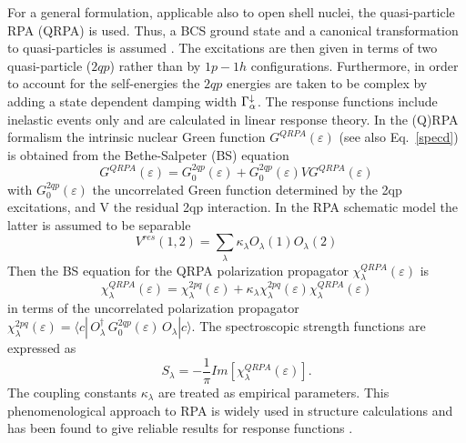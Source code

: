 For a general formulation, applicable also to open shell nuclei, the
quasi-particle RPA (QRPA) is used. Thus, a BCS%
 ground state and a canonical transformation to quasi-particles
is assumed \cite{RS}. The excitations are then given in terms of two
quasi-particle ($2qp$) rather than by $1p-1h$ configurations. Furthermore,
in order to account for the self-energies the $2qp$ energies are taken to be
complex by adding a state dependent damping width $\Gamma_{\alpha}^{%
\downarrow}$. The response functions include inelastic events only and are
calculated in linear response theory. In the (Q)RPA formalism the intrinsic
nuclear Green function $G^{QRPA}(\varepsilon)$ (see also Eq.~\ref{specd}) is
obtained from the Bethe-Salpeter (BS) equation \cite{Wal} 
\begin{equation}
G^{QRPA}(\varepsilon) = G_{0}^{2qp}(\varepsilon)+
G_{0}^{2qp}(\varepsilon)VG^{QRPA}(\varepsilon)  \label{bs1}
\end{equation}
with $G_{0}^{2qp}(\varepsilon)$ the uncorrelated Green function determined
by the 2qp excitations, and V the residual 2qp interaction. In the RPA
schematic model the latter is assumed to be separable 
\begin{equation}
V^{res}(1,2)=\sum_{\lambda}\kappa _{\lambda}O_{\lambda}(1)O_{\lambda}(2)
\end{equation}
Then the BS equation for the QRPA polarization propagator $%
\chi_{\lambda}^{QRPA}(\varepsilon)$ is \cite{Lenske:01} 
\begin{equation}
\chi_{\lambda}^{QRPA}(\varepsilon)= \chi_{\lambda}^{2pq}(\varepsilon) +
\kappa_{\lambda}\chi_{\lambda}^{2pq}(\varepsilon)\chi_{\lambda}^{QRPA}(%
\varepsilon)  \label{bs2}
\end{equation}
in terms of the uncorrelated polarization propagator $\chi_{\lambda}^{2pq}
(\varepsilon) = \langle c|\,O_{\lambda}^{\dagger }\,G_{0}^{2qp}(\varepsilon
)\,O_{\lambda}|c\rangle$. The spectroscopic strength functions are expressed
as 
\begin{equation}
S_{\lambda} =-%
\frac{1}{\pi}Im[\chi_{\lambda}^{QRPA}(\varepsilon)].  \label{sprpa}
\end{equation}
The coupling constants $\kappa_{\lambda}$ are treated as empirical
parameters. This phenomenological approach to RPA%
 is widely used in structure calculations and has been found to
give reliable results for response functions \cite{BM,Solv}.

